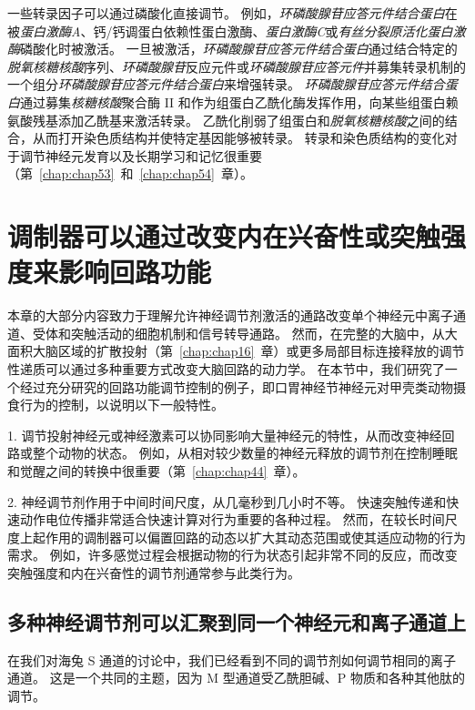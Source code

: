 一些转录因子可以通过磷酸化直接调节。
例如，\textit{环磷酸腺苷应答元件结合蛋白}在被\textit{蛋白激酶A}、钙/钙调蛋白依赖性蛋白激酶、\textit{蛋白激酶C}或\textit{有丝分裂原活化蛋白激酶}磷酸化时被激活。
一旦被激活，\textit{环磷酸腺苷应答元件结合蛋白}通过结合特定的\textit{脱氧核糖核酸}序列、\textit{环磷酸腺苷}反应元件或\textit{环磷酸腺苷应答元件}并募集转录机制的一个组分\textit{环磷酸腺苷应答元件结合蛋白}来增强转录。
\textit{环磷酸腺苷应答元件结合蛋白}通过募集\textit{核糖核酸}聚合酶 II 和作为组蛋白乙酰化酶发挥作用，向某些组蛋白赖氨酸残基添加乙酰基来激活转录。
乙酰化削弱了组蛋白和\textit{脱氧核糖核酸}之间的结合，从而打开染色质结构并使特定基因能够被转录。
转录和染色质结构的变化对于调节神经元发育以及长期学习和记忆很重要（第~\ref{chap:chap53}~和~\ref{chap:chap54}~章）。



\section{调制器可以通过改变内在兴奋性或突触强度来影响回路功能}

本章的大部分内容致力于理解允许神经调节剂激活的通路改变单个神经元中离子通道、受体和突触活动的细胞机制和信号转导通路。
然而，在完整的大脑中，从大面积大脑区域的扩散投射（第~\ref{chap:chap16}~章）或更多局部目标连接释放的调节性递质可以通过多种重要方式改变大脑回路的动力学。
在本节中，我们研究了一个经过充分研究的回路功能调节控制的例子，即口胃神经节神经元对甲壳类动物摄食行为的控制，以说明以下一般特性。


1. 调节投射神经元或神经激素可以协同影响大量神经元的特性，从而改变神经回路或整个动物的状态。
例如，从相对较少数量的神经元释放的调节剂在控制睡眠和觉醒之间的转换中很重要（第~\ref{chap:chap44}~章）。


2. 神经调节剂作用于中间时间尺度，从几毫秒到几小时不等。
快速突触传递和快速动作电位传播非常适合快速计算对行为重要的各种过程。
然而，在较长时间尺度上起作用的调制器可以偏置回路的动态以扩大其动态范围或使其适应动物的行为需求。
例如，许多感觉过程会根据动物的行为状态引起非常不同的反应，而改变突触强度和内在兴奋性的调节剂通常参与此类行为。



\subsection{多种神经调节剂可以汇聚到同一个神经元和离子通道上}

在我们对海兔 S 通道的讨论中，我们已经看到不同的调节剂如何调节相同的离子通道。
这是一个共同的主题，因为 M 型通道受乙酰胆碱、P 物质和各种其他肽的调节。


